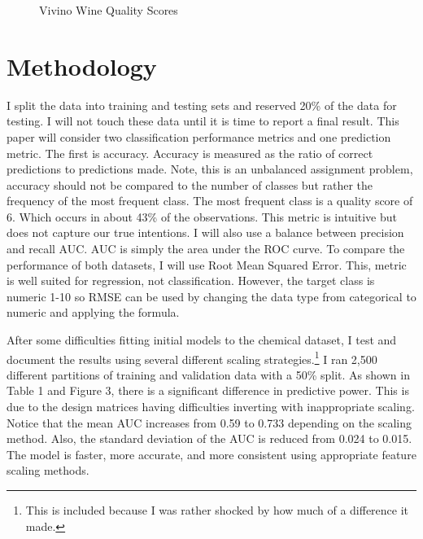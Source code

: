 \documentclass[16pt,twocolumn,letterpaper,titlepage]{article}
\begin{document}
\begin{figure}[!htb]
	\caption{\label{fig:my-label} Vivino Wine Quality Scores}
\end{figure}

\section{Methodology}

I split the data into training and testing sets and reserved 20\% of the data for testing. I will not touch these data until it is time to report a final result. This paper will consider two classification performance metrics and one prediction metric. The first is accuracy. Accuracy is measured as the ratio of correct predictions to predictions made. Note, this is an unbalanced assignment problem, accuracy should not be compared to the number of classes but rather the frequency of the most frequent class. The most frequent class is a quality score of 6. Which occurs in about 43\% of the observations. This metric is intuitive but does not capture our true intentions. I will also use a balance between precision and recall AUC. AUC is simply the area under the ROC curve. To compare the performance of both datasets, I will use Root Mean Squared Error. This, metric is well suited for regression, not classification. However, the target class is numeric 1-10 so RMSE can be used by changing the data type from categorical to numeric and applying the formula. 

After some difficulties fitting initial models to the chemical dataset, I test and document the results using several different scaling strategies.\footnote{This is included because I was rather shocked by how much of a difference it made.}  I ran 2,500 different partitions of training and validation data with a 50\% split. As shown in Table 1 and Figure 3, there is a significant difference in predictive power. This is due to the design matrices having difficulties inverting with inappropriate scaling. Notice that the mean AUC increases from 0.59 to 0.733 depending on the scaling method. Also, the standard deviation of the AUC is reduced from 0.024 to 0.015. The model is faster, more accurate, and more consistent using appropriate feature scaling methods. 
\end{document}
